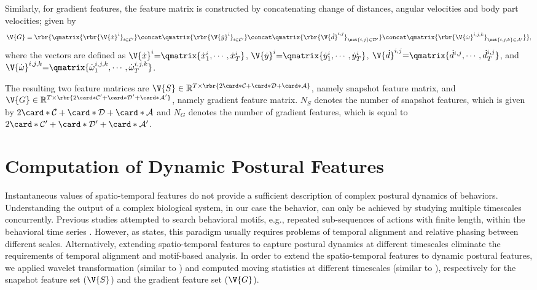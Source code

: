 Similarly, for gradient features, the feature matrix is constructed by concatenating change of distances, angular velocities and body part velocities; given by
\begin{equation}
	\V{G} = \rbr{\qmatrix{\rbr{\V{\dot{x}}^i}_{i \in \mathcal{C}^{\prime}}} \concat \qmatrix{\rbr{\V{\dot{y}}^i}_{i \in \mathcal{C}^{\prime}}} \concat \qmatrix{\rbr{\V{\dot{d}}^{i,j}}_{\set{i,j} \in \mathcal{D}^{\prime}}} \concat \qmatrix{\rbr{\V{\dot{\omega}}^{i,j,k}}_{\set{i,j,k} \in \mathcal{A}^{\prime}}}},
\end{equation}
where the vectors are defined as $\V{\dot{x}}^{i}{=}\qmatrix{\dot{x}^{i}_1, \cdots, \dot{x}^{i}_T}$, $\V{\dot{y}}^{i}{=}\qmatrix{\dot{y}^{i}_1, \cdots, \dot{y}^{i}_T}$,   $\V{\dot{d}}^{i,j}{=}\qmatrix{\dot{d}^{i,j}, \cdots, \dot{d}^{i,j}_T}$, and $\V{\dot{\omega}}^{i,j,k}{=}\qmatrix{\dot{\omega}_1^{i,j,k}, \cdots, \dot{\omega}^{i,j,k}_T}$.

The resulting two feature matrices are $\V{S} \in \mathbb{R}^{T \times \rbr{2\card*{\mathcal{C}}+\card*{\mathcal{D}}+\card*{\mathcal{A}}}}$, namely snapshot feature matrix, and $\V{G} \in \mathbb{R}^{T \times \rbr{2\card*{\mathcal{C}^{\prime}}+\card*{\mathcal{D}^{\prime}}+\card*{\mathcal{A}^{\prime}}}}$, namely gradient feature matrix. $N_S$ denotes the number of snapshot features, which is given by $2\card*{\mathcal{C}}+\card*{\mathcal{D}}+\card*{\mathcal{A}}$ and $N_G$ denotes the number of gradient features, which is equal to $2\card*{\mathcal{C}^{\prime}}+\card*{\mathcal{D}^{\prime}}+\card*{\mathcal{A}^{\prime}}$.

\section{Computation of Dynamic Postural Features}\label{section:dynamic-postural-features}
Instantaneous values of spatio-temporal features do not provide a sufficient description of complex postural dynamics of behaviors.
Understanding the output of a complex biological system, in our case the behavior, can only be achieved by studying multiple timescales concurrently.
Previous studies attempted to search behavioral motifs, e.g., repeated sub-sequences of actions with finite length, within the behavioral time series \citep{ye_time_2011, brown_dictionary_2013}.
However, as \citet{berman_mapping_2014} states, this paradigm usually requires problems of temporal alignment and relative phasing between different scales.
Alternatively, extending spatio-temporal features to capture postural dynamics at different timescales eliminate the requirements of temporal alignment and motif-based analysis.
In order to extend the spatio-temporal features to dynamic postural features, we applied wavelet transformation (similar to \citet{berman_mapping_2014}) and computed moving statistics at different timescales (similar to \citet{kabra_jaaba_2013}), respectively for the snapshot feature set ($\V{S}$) and the gradient feature set ($\V{G}$).

